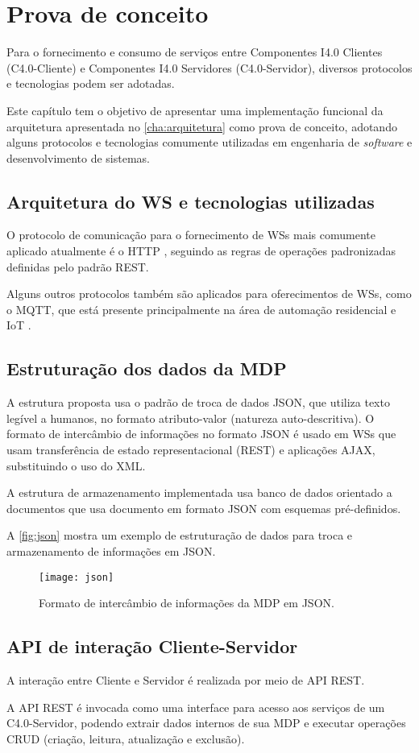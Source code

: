 \chapter{Prova de conceito}
\label{cha:prova-de-conceito}

	Para o fornecimento e consumo de serviços entre Componentes I4.0 Clientes (C4.0-Cliente) e Componentes I4.0 Servidores (C4.0-Servidor), diversos protocolos e tecnologias podem ser adotadas.
	
	Este capítulo tem o objetivo de apresentar uma implementação funcional da arquitetura apresentada no \autoref{cha:arquitetura} como prova de conceito, adotando alguns protocolos e tecnologias comumente utilizadas em engenharia de \textit{software} e desenvolvimento de sistemas.
	

\section{Arquitetura do WS e tecnologias utilizadas}

	O protocolo de comunicação para o fornecimento de WSs mais comumente aplicado atualmente é o HTTP \cite{gruner2016restful}, seguindo as regras de operações padronizadas definidas pelo padrão REST.
	
	Alguns outros protocolos também são aplicados para oferecimentos de WSs, como o MQTT, que está presente principalmente na área de automação residencial e IoT \cite{yokotani2016mqtt}.


\section{Estruturação dos dados da MDP}

	A estrutura proposta usa o padrão de troca de dados JSON, que utiliza texto legível a humanos, no formato atributo-valor (natureza auto-descritiva). O formato de intercâmbio de informações no formato JSON é usado em WSs que usam transferência de estado representacional (REST) e aplicações AJAX, substituindo o uso do XML.
	
	A estrutura de armazenamento implementada usa banco de dados orientado a documentos que usa documento em formato JSON com esquemas pré-definidos.
	
	A \autoref{fig:json} mostra um exemplo de estruturação de dados para troca e armazenamento de informações em JSON.
	
	\begin{figure}[htb]
		\centering
		\caption{Formato de intercâmbio de informações da MDP em JSON.}
		\label{fig:json}
		\texttt{[image: json]}
	\end{figure}

	
\section{API de interação Cliente-Servidor}

	A interação entre Cliente e Servidor é realizada por meio de API REST.
	
	A API REST é invocada como uma interface para acesso aos serviços de um C4.0-Servidor, podendo extrair dados internos de sua MDP e executar operações CRUD (criação, leitura, atualização e exclusão).
	